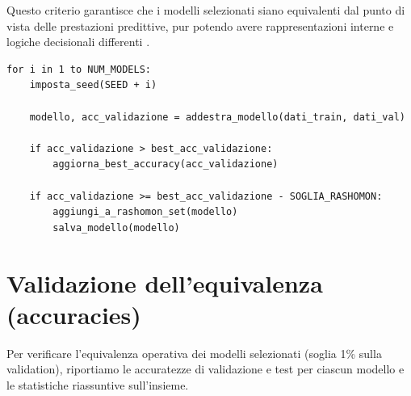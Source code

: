 \documentclass[12pt,a4paper,oneside]{report}
\numberwithin{figure}{chapter}
\numberwithin{table}{chapter}
\begin{document}
Questo criterio garantisce che i modelli selezionati siano equivalenti dal
punto di vista delle prestazioni predittive, pur potendo avere rappresentazioni
interne e logiche decisionali differenti
\citep{leventi2023consistency,mueller2023rashomon}.

\begin{lstlisting}[caption={Addestramento modelli e selezione Rashomon set}, label={lst:rashomon_training}]
for i in 1 to NUM_MODELS:
    imposta_seed(SEED + i)
    
    modello, acc_validazione = addestra_modello(dati_train, dati_val)
    
    if acc_validazione > best_acc_validazione:
        aggiorna_best_accuracy(acc_validazione)

    if acc_validazione >= best_acc_validazione - SOGLIA_RASHOMON:
        aggiungi_a_rashomon_set(modello)
        salva_modello(modello)
\end{lstlisting}

\section{Validazione dell’equivalenza (accuracies)}
\label{sec:rashomon_equivalenza}

Per verificare l’equivalenza operativa dei modelli selezionati (soglia 1\%
sulla validation), riportiamo le accuratezze di validazione e test per ciascun
modello e le statistiche riassuntive sull’insieme.
\end{document}
